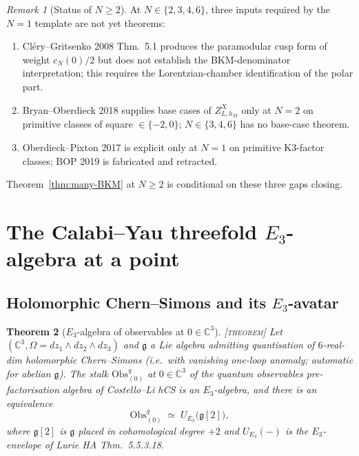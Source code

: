 \documentclass[11pt]{amsart}
\providecommand{\C}{\mathbb{C}}
\providecommand{\g}{\mathfrak{g}}
\providecommand{\Obs}{\mathrm{Obs}}
\providecommand{\Ethree}{E_3}
\providecommand{\ClaimStatusTheorem}{\textsc{[theorem]}}
\theoremstyle{plain}
\newtheorem{theorem}{Theorem}[section]
\theoremstyle{definition}
\theoremstyle{remark}
\newtheorem{remark}[theorem]{Remark}
\begin{document}
\begin{remark}[Status of $N\geq 2$]
\label{rem:Nge2-status}
At $N\in\{2,3,4,6\}$, three inputs required by the $N=1$ template are
not yet theorems:
\begin{enumerate}
\item Cl\'ery--Gritsenko 2008 Thm.~5.1 produces the paramodular cusp
form of weight $c_N(0)/2$ but does not establish the BKM-denominator
interpretation; this requires the Lorentzian-chamber identification of
the polar part.
\item Bryan--Oberdieck 2018 supplies base cases of
$Z^X_{L,h_M}$ only at $N=2$ on primitive classes of square
$\in\{-2,0\}$; $N\in\{3,4,6\}$ has no base-case theorem.
\item Oberdieck--Pixton 2017 is explicit only at $N=1$ on primitive
K3-factor classes; BOP 2019 is fabricated and retracted.
\end{enumerate}
Theorem~\ref{thm:many-BKM} at $N\geq 2$ is conditional on these three
gaps closing.
\end{remark}

\section{The Calabi--Yau threefold $\Ethree$-algebra at a point}

\subsection{Holomorphic Chern--Simons and its $\Ethree$-avatar}

\begin{theorem}[$\Ethree$-algebra of observables at $0\in\C^3$]
\label{thm:E3-avatar}
\ClaimStatusTheorem{}\;
Let $(\C^3,\Omega=dz_1\wedge dz_2\wedge dz_3)$ and $\g$ a Lie algebra
admitting quantisation of $6$-real-dim holomorphic Chern--Simons
(i.e.\ with vanishing one-loop anomaly; automatic for abelian $\g$).
The stalk $\Obs^{q}_{(0)}$ at $0\in\C^3$ of the quantum observables
pre-factorisation algebra of Costello--Li hCS is an $\Ethree$-algebra,
and there is an equivalence
\[
\Obs^{q}_{(0)}\;\simeq\;U_{\Ethree}\bigl(\g[2]\bigr),
\]
where $\g[2]$ is $\g$ placed in cohomological degree $+2$ and
$U_{\Ethree}(-)$ is the $\Ethree$-envelope of Lurie HA Thm.~5.5.3.18.
\end{theorem}
\end{document}
